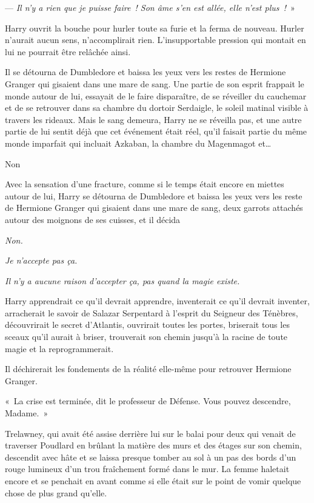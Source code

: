 --- \emph{Il n'y a rien que je puisse faire~! Son âme s'en est allée, elle n'est plus~!}~»

Harry ouvrit la bouche pour hurler toute sa furie et la ferma de nouveau. Hurler n'aurait aucun sens, n'accomplirait rien. L'insupportable pression qui montait en lui ne pourrait être relâchée ainsi.

Il se détourna de Dumbledore et baissa les yeux vers les restes de Hermione Granger qui gisaient dans une mare de sang. Une partie de son esprit frappait le monde autour de lui, essayait de le faire disparaître, de se réveiller du cauchemar et de se retrouver dans sa chambre du dortoir Serdaigle, le soleil matinal visible à travers les rideaux. Mais le sang demeura, Harry ne se réveilla pas, et une autre partie de lui sentit déjà que cet événement était réel, qu'il faisait partie du même monde imparfait qui incluait Azkaban, la chambre du Magenmagot et…

Non

Avec la sensation d'une fracture, comme si le temps était encore en miettes autour de lui, Harry se détourna de Dumbledore et baissa les yeux vers les reste de Hermione Granger qui gisaient dans une mare de sang, deux garrots attachés autour des moignons de ses cuisses, et il décida

\emph{Non.}

\emph{Je n'accepte pas ça.}

\emph{Il n'y a aucune raison d'accepter ça, pas quand la magie existe.}

Harry apprendrait ce qu'il devrait apprendre, inventerait ce qu'il devrait inventer, arracherait le savoir de Salazar Serpentard à l'esprit du Seigneur des Ténèbres, découvrirait le secret d'Atlantis, ouvrirait toutes les portes, briserait tous les sceaux qu'il aurait à briser, trouverait son chemin jusqu'à la racine de toute magie et la reprogrammerait.

Il déchirerait les fondements de la réalité elle-même pour retrouver Hermione Granger.

\later

«~La crise est terminée, dit le professeur de Défense. Vous pouvez descendre, Madame.~»

Trelawney, qui avait été assise derrière lui sur le balai pour deux qui venait de traverser Poudlard en brûlant la matière des murs et des étages sur son chemin, descendit avec hâte et se laissa presque tomber au sol à un pas des bords d'un rouge lumineux d'un trou fraîchement formé dans le mur. La femme haletait encore et se penchait en avant comme si elle était sur le point de vomir quelque chose de plus grand qu'elle.

